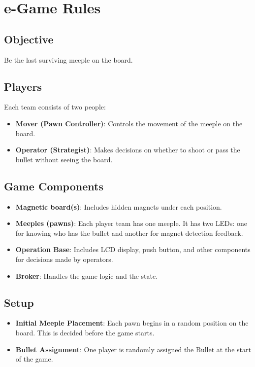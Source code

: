 \documentclass[../main.tex]{subfiles}
\begin{document}
\section{e-Game Rules}

\subsection{Objective}

Be the last surviving meeple on the board.

\subsection{Players}

Each team consists of two people:
\begin{itemize}
    \item \textbf{Mover (Pawn Controller)}: Controls the movement of the meeple on the board.
    \item \textbf{Operator (Strategist)}: Makes decisions on whether to shoot or pass the bullet without seeing the board.
\end{itemize}

\subsection{Game Components}
\begin{itemize}
    \item \textbf{Magnetic board(s)}: Includes hidden magnets under each position.
    \item \textbf{Meeples (pawns)}: Each player team has one meeple. It has two LEDs: one for knowing who has the bullet and another for magnet detection feedback.
    \item \textbf{Operation Base}: Includes LCD display, push button, and other components for decisions made by operators.
    \item \textbf{Broker}: Handles the game logic and the state.
\end{itemize}

\subsection{Setup}
\begin{itemize}
    \item \textbf{Initial Meeple Placement}: Each pawn begins in a random position on the board. This is decided before the game starts.
    \item \textbf{Bullet Assignment}: One player is randomly assigned the Bullet at the start of the game.
\end{itemize}
\end{document}
